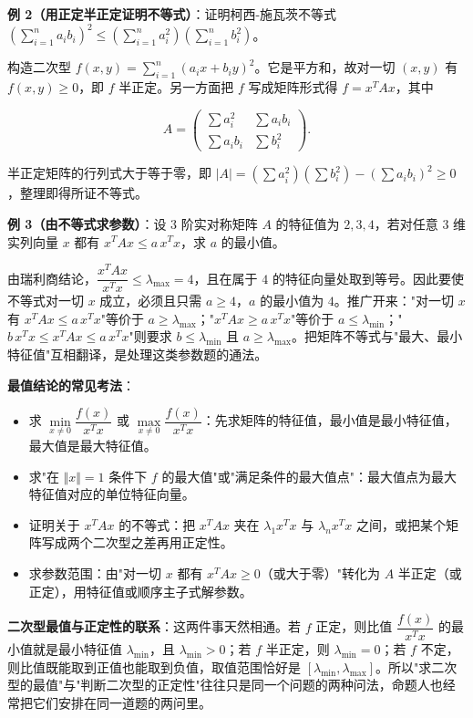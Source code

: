 \documentclass[11pt,openany,UTF8]{ctexbook}
\begin{document}
\textbf{例 2（用正定半正定证明不等式）}：证明柯西-施瓦茨不等式 $\left(\sum\limits_{i=1}^{n}a_ib_i\right)^2\leq\left(\sum\limits_{i=1}^{n}a_i^2\right)\left(\sum\limits_{i=1}^{n}b_i^2\right)$。

构造二次型 $f(x,y)=\sum\limits_{i=1}^{n}(a_ix+b_iy)^2$。它是平方和，故对一切 $(x,y)$ 有 $f(x,y)\geq0$，即 $f$ 半正定。另一方面把 $f$ 写成矩阵形式得 $f=x^TAx$，其中

\[A=\begin{pmatrix}\sum a_i^2&\sum a_ib_i\\ \sum a_ib_i&\sum b_i^2\end{pmatrix}.\]

半正定矩阵的行列式大于等于零，即 $\vert A\vert=\left(\sum a_i^2\right)\left(\sum b_i^2\right)-\left(\sum a_ib_i\right)^2\geq0$，整理即得所证不等式。

\textbf{例 3（由不等式求参数）}：设 $3$ 阶实对称矩阵 $A$ 的特征值为 $2,3,4$，若对任意 $3$ 维实列向量 $x$ 都有 $x^TAx\leq a\,x^Tx$，求 $a$ 的最小值。

由瑞利商结论，$\dfrac{x^TAx}{x^Tx}\leq\lambda_{\max}=4$，且在属于 $4$ 的特征向量处取到等号。因此要使不等式对一切 $x$ 成立，必须且只需 $a\geq4$，$a$ 的最小值为 $4$。推广开来："对一切 $x$ 有 $x^TAx\leq a\,x^Tx$"等价于 $a\geq\lambda_{\max}$；"$x^TAx\geq a\,x^Tx$"等价于 $a\leq\lambda_{\min}$；"$b\,x^Tx\leq x^TAx\leq a\,x^Tx$"则要求 $b\leq\lambda_{\min}$ 且 $a\geq\lambda_{\max}$。把矩阵不等式与"最大、最小特征值"互相翻译，是处理这类参数题的通法。

\textbf{最值结论的常见考法}：

\begin{itemize}
\item 求 $\min\limits_{x\neq0}\dfrac{f(x)}{x^Tx}$ 或 $\max\limits_{x\neq0}\dfrac{f(x)}{x^Tx}$：先求矩阵的特征值，最小值是最小特征值，最大值是最大特征值。
\item 求"在 $\Vert x\Vert=1$ 条件下 $f$ 的最大值"或"满足条件的最大值点"：最大值点为最大特征值对应的单位特征向量。
\item 证明关于 $x^TAx$ 的不等式：把 $x^TAx$ 夹在 $\lambda_1x^Tx$ 与 $\lambda_nx^Tx$ 之间，或把某个矩阵写成两个二次型之差再用正定性。
\item 求参数范围：由"对一切 $x$ 都有 $x^TAx\geq0$（或大于零）"转化为 $A$ 半正定（或正定），用特征值或顺序主子式解参数。
\end{itemize}
\textbf{二次型最值与正定性的联系}：这两件事天然相通。若 $f$ 正定，则比值 $\dfrac{f(x)}{x^Tx}$ 的最小值就是最小特征值 $\lambda_{\min}$，且 $\lambda_{\min}>0$；若 $f$ 半正定，则 $\lambda_{\min}=0$；若 $f$ 不定，则比值既能取到正值也能取到负值，取值范围恰好是 $[\lambda_{\min},\lambda_{\max}]$。所以"求二次型的最值"与"判断二次型的正定性"往往只是同一个问题的两种问法，命题人也经常把它们安排在同一道题的两问里。
\end{document}
